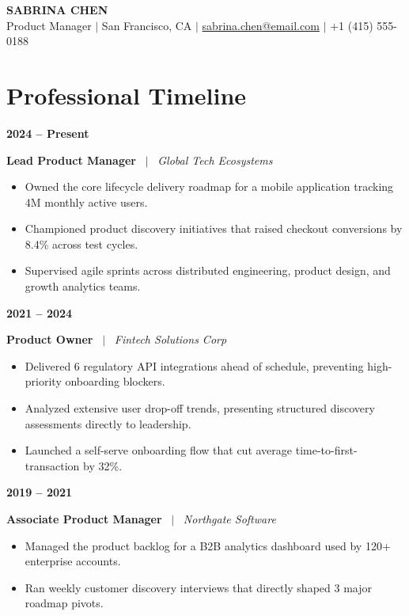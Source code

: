 \documentclass[10pt,letterpaper]{article}
\newcommand{\timelineEntry}[4]{
  \vspace{6pt}
  \noindent
  \begin{minipage}[t]{0.22\textwidth}
    \textbf{\color{brand}#1}
  \end{minipage}%
  \begin{minipage}[t]{0.78\textwidth}
    \textbf{\color{textdark}#2} \ $|$ \ \textit{#3} \\ \vspace{2pt}
    #4
  \end{minipage}
  \vspace{4pt}
}
\begin{document}
\color{textdark}

\begin{center}
    {\Huge \textbf{SABRINA CHEN}} \\ \vspace{4pt}
    \small Product Manager $|$ San Francisco, CA $|$ \href{mailto:sabrina.chen@email.com}{sabrina.chen@email.com} $|$ +1 (415) 555-0188
\end{center}

\section{Professional Timeline}

\timelineEntry{2024 -- Present}{Lead Product Manager}{Global Tech Ecosystems}{
  \begin{itemize}[leftmargin=0.15in, topsep=0pt, itemsep=2pt]
    \item Owned the core lifecycle delivery roadmap for a mobile application tracking 4M monthly active users.
    \item Championed product discovery initiatives that raised checkout conversions by 8.4\% across test cycles.
    \item Supervised agile sprints across distributed engineering, product design, and growth analytics teams.
  \end{itemize}
}

\timelineEntry{2021 -- 2024}{Product Owner}{Fintech Solutions Corp}{
  \begin{itemize}[leftmargin=0.15in, topsep=0pt, itemsep=2pt]
    \item Delivered 6 regulatory API integrations ahead of schedule, preventing high-priority onboarding blockers.
    \item Analyzed extensive user drop-off trends, presenting structured discovery assessments directly to leadership.
    \item Launched a self-serve onboarding flow that cut average time-to-first-transaction by 32\%.
  \end{itemize}
}

\timelineEntry{2019 -- 2021}{Associate Product Manager}{Northgate Software}{
  \begin{itemize}[leftmargin=0.15in, topsep=0pt, itemsep=2pt]
    \item Managed the product backlog for a B2B analytics dashboard used by 120+ enterprise accounts.
    \item Ran weekly customer discovery interviews that directly shaped 3 major roadmap pivots.
  \end{itemize}
}
\end{document}
